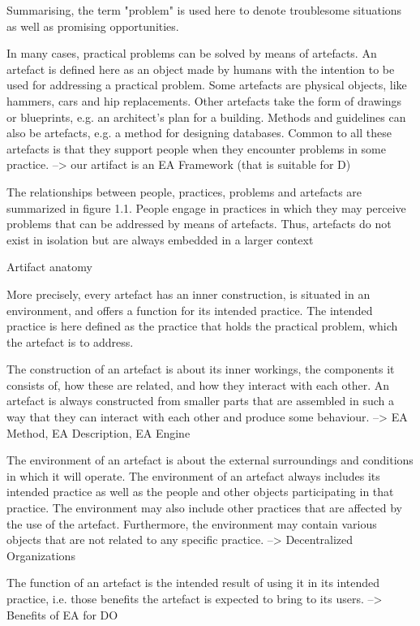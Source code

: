 Summarising,
the term "problem" is used here to denote troublesome situations as
well as promising opportunities.

In many cases, practical problems can be solved by means of artefacts.
An artefact is defined here as an object made by humans with the intention to be used for addressing a practical problem. Some
artefacts are physical objects, like hammers, cars and hip replacements. Other artefacts take the form of drawings or blueprints, e.g.
an architect's plan for a building. Methods and guidelines can also be
artefacts, e.g. a method for designing databases. Common to all these
artefacts is that they support people when they encounter problems
in some practice. --> our artifact is an EA Framework (that is suitable for D)

The relationships between people, practices, problems and artefacts
are summarized in figure 1.1. People engage in practices in
which they may perceive problems that can be addressed by means
of artefacts. Thus, artefacts do not exist in isolation but are always
embedded in a larger context

Artifact anatomy

More precisely, every artefact has an inner construction,
is situated in an environment, and offers a function for its
intended practice. The intended practice is here defined as the practice
that holds the practical problem, which the artefact is to address.

The construction of an artefact is about its inner workings, the
components it consists of, how these are related, and how they interact
with each other. An artefact is always constructed from smaller
parts that are assembled in such a way that they can interact with
each other and produce some behaviour. --> EA Method, EA Description, EA Engine


The environment of an artefact is about the external surroundings
and conditions in which it will operate. The environment of an
artefact always includes its intended practice as well as the people
and other objects participating in that practice. The environment
may also include other practices that are affected by the use of the
artefact. Furthermore, the environment may contain various objects
that are not related to any specific practice. --> Decentralized Organizations


The function of an artefact is the intended result of using it in its
intended practice, i.e. those benefits the artefact is expected to bring
to its users. --> Benefits of EA for DO

